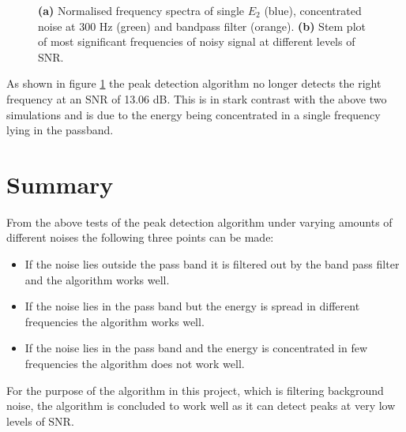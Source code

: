 \begin{figure}[H]
\begin{subfigure}{0.49\textwidth}
\caption{}
\label{fig:concentrated_stem}
\end{subfigure}
\caption{\textbf{(a)} Normalised frequency spectra of single $E_2$ (blue), concentrated noise at 300 Hz (green) and bandpass filter (orange). \textbf{(b)} Stem plot of most significant frequencies of noisy signal at different levels of SNR.}
\label{fig:concentrated_noise}
\end{figure}

As shown in figure \ref{fig:concentrated_stem} the peak detection algorithm no longer detects the right frequency at an SNR of 13.06 dB. This is in stark contrast with the above two simulations and is due to the energy being concentrated in a single frequency lying in the passband.

\section{Summary}
From the above tests of the peak detection algorithm under varying amounts of different noises the following three points can be made:
\begin{itemize}
\item If the noise lies outside the pass band it is filtered out by the band pass filter and the algorithm works well.
\item If the noise lies in the pass band but the energy is spread in different frequencies the algorithm works well.
\item If the noise lies in the pass band and the energy is concentrated in few frequencies the algorithm does not work well.
\end{itemize}
For the purpose of the algorithm in this project, which is filtering background noise, the algorithm is concluded to work well as it can detect peaks at very low levels of SNR.